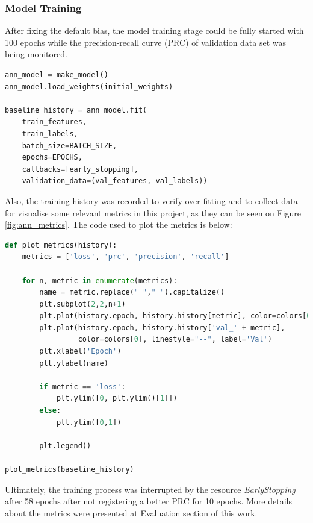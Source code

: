 \documentclass{article}
\begin{document}
\subsubsection{Model Training}

After fixing the default bias, the model training stage could be fully started with 100 epochs while the precision-recall curve (PRC) of validation data set was being monitored. 

\begin{lstlisting}[language=Python]
ann_model = make_model()
ann_model.load_weights(initial_weights)

baseline_history = ann_model.fit(
    train_features,
    train_labels,
    batch_size=BATCH_SIZE,
    epochs=EPOCHS,
    callbacks=[early_stopping],
    validation_data=(val_features, val_labels))
\end{lstlisting}

Also, the training history was recorded to verify over-fitting and to collect data for visualise some relevant metrics in this project, as they can be seen on Figure \ref{fig:ann_metrics}. The code used to plot the metrics is below:

\begin{lstlisting}[language=Python]
def plot_metrics(history):
    metrics = ['loss', 'prc', 'precision', 'recall']
    
    for n, metric in enumerate(metrics):
        name = metric.replace("_"," ").capitalize()
        plt.subplot(2,2,n+1)
        plt.plot(history.epoch, history.history[metric], color=colors[0], label='Train')
        plt.plot(history.epoch, history.history['val_' + metric],
                 color=colors[0], linestyle="--", label='Val')
        plt.xlabel('Epoch')
        plt.ylabel(name)
        
        if metric == 'loss':
            plt.ylim([0, plt.ylim()[1]])
        else:
            plt.ylim([0,1])

        plt.legend()

plot_metrics(baseline_history)
\end{lstlisting}

Ultimately, the training process was interrupted by the resource \emph{EarlyStopping} after 58 epochs after not registering a better PRC for 10 epochs. More details about the metrics were presented at Evaluation section of this work.
\end{document}

